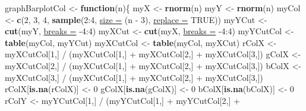 \documentclass[twoside,symmetric]{book}
\newenvironment{Shaded}{}{}
\newcommand{\ControlFlowTok}[1]{\textbf{#1}}
\newcommand{\DataTypeTok}[1]{\underline{#1}}
\newcommand{\DecValTok}[1]{#1}
\newcommand{\KeywordTok}[1]{\textbf{#1}}
\newcommand{\NormalTok}[1]{#1}
\newcommand{\OperatorTok}[1]{#1}
\newcommand{\OtherTok}[1]{#1}
\newcommand{\StringTok}[1]{#1}
\begin{document}
\begin{Shaded}
\begin{Highlighting}[]
\NormalTok{graphBarplotCol <-}\StringTok{ }\ControlFlowTok{function}\NormalTok{(n)\{}
\NormalTok{  myX <-}\StringTok{ }\KeywordTok{rnorm}\NormalTok{(n)}
\NormalTok{  myY <-}\StringTok{ }\KeywordTok{rnorm}\NormalTok{(n)}
\NormalTok{  myCol <-}\StringTok{ }\KeywordTok{c}\NormalTok{(}\DecValTok{2}\NormalTok{, }\DecValTok{3}\NormalTok{, }\DecValTok{4}\NormalTok{, }\KeywordTok{sample}\NormalTok{(}\DecValTok{2}\OperatorTok{:}\DecValTok{4}\NormalTok{, }\DataTypeTok{size =}\NormalTok{ (n }\OperatorTok{-}\StringTok{ }\DecValTok{3}\NormalTok{), }\DataTypeTok{replace =} \OtherTok{TRUE}\NormalTok{))}
\NormalTok{  myYCut <-}\StringTok{ }\KeywordTok{cut}\NormalTok{(myY, }\DataTypeTok{breaks =} \DecValTok{-4}\OperatorTok{:}\DecValTok{4}\NormalTok{)}
\NormalTok{  myXCut <-}\StringTok{ }\KeywordTok{cut}\NormalTok{(myX, }\DataTypeTok{breaks =} \DecValTok{-4}\OperatorTok{:}\DecValTok{4}\NormalTok{)}
\NormalTok{  myYCutCol <-}\StringTok{ }\KeywordTok{table}\NormalTok{(myCol, myYCut)}
\NormalTok{  myXCutCol <-}\StringTok{ }\KeywordTok{table}\NormalTok{(myCol, myXCut)}
\NormalTok{  rColX <-}\StringTok{ }\NormalTok{myXCutCol[}\DecValTok{1}\NormalTok{,] }\OperatorTok{/}\StringTok{ }\NormalTok{(myXCutCol[}\DecValTok{1}\NormalTok{,] }\OperatorTok{+}\StringTok{ }\NormalTok{myXCutCol[}\DecValTok{2}\NormalTok{,] }\OperatorTok{+}\StringTok{ }
\StringTok{    }\NormalTok{myXCutCol[}\DecValTok{3}\NormalTok{,])}
\NormalTok{  gColX <-}\StringTok{ }\NormalTok{myXCutCol[}\DecValTok{2}\NormalTok{,] }\OperatorTok{/}\StringTok{ }\NormalTok{(myXCutCol[}\DecValTok{1}\NormalTok{,] }\OperatorTok{+}\StringTok{ }\NormalTok{myXCutCol[}\DecValTok{2}\NormalTok{,] }\OperatorTok{+}\StringTok{ }
\StringTok{    }\NormalTok{myXCutCol[}\DecValTok{3}\NormalTok{,])}
\NormalTok{  bColX <-}\StringTok{ }\NormalTok{myXCutCol[}\DecValTok{3}\NormalTok{,] }\OperatorTok{/}\StringTok{ }\NormalTok{(myXCutCol[}\DecValTok{1}\NormalTok{,] }\OperatorTok{+}\StringTok{ }\NormalTok{myXCutCol[}\DecValTok{2}\NormalTok{,] }\OperatorTok{+}\StringTok{ }
\StringTok{    }\NormalTok{myXCutCol[}\DecValTok{3}\NormalTok{,])}
\NormalTok{  rColX[}\KeywordTok{is.na}\NormalTok{(rColX)] <-}\StringTok{ }\DecValTok{0}
\NormalTok{  gColX[}\KeywordTok{is.na}\NormalTok{(gColX)] <-}\StringTok{ }\DecValTok{0}
\NormalTok{  bColX[}\KeywordTok{is.na}\NormalTok{(bColX)] <-}\StringTok{ }\DecValTok{0}
\NormalTok{  rColY <-}\StringTok{ }\NormalTok{myYCutCol[}\DecValTok{1}\NormalTok{,] }\OperatorTok{/}\StringTok{ }\NormalTok{(myYCutCol[}\DecValTok{1}\NormalTok{,] }\OperatorTok{+}\StringTok{ }\NormalTok{myYCutCol[}\DecValTok{2}\NormalTok{,] }\OperatorTok{+}\StringTok{ }

\end{Highlighting}
\end{Shaded}
\end{document}
